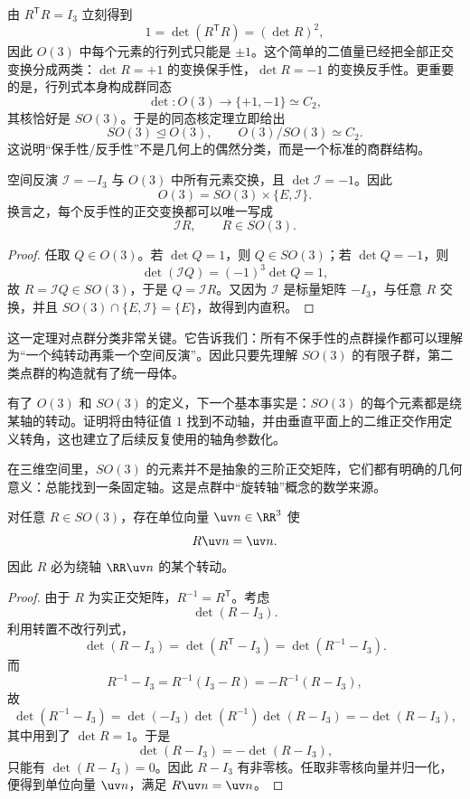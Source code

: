 由 $R^{\mathsf T}R=I_3$ 立刻得到
\[
1=\det(R^{\mathsf T}R)=(\det R)^2,
\]
因此 $O(3)$ 中每个元素的行列式只能是 $\pm1$。这个简单的二值量已经把全部正交变换分成两类：$\det R=+1$ 的变换保手性，$\det R=-1$ 的变换反手性。更重要的是，行列式本身构成群同态
\[
\det:O(3)\longrightarrow\{+1,-1\}\simeq C_2,
\]
其核恰好是 $SO(3)$。于是的同态核定理立即给出
\[
SO(3)\mathrel{\trianglelefteq} O(3),
\qquad
O(3)/SO(3)\simeq C_2.
\]
这说明“保手性/反手性”不是几何上的偶然分类，而是一个标准的商群结构。

\begin{proposition}[$O(3)$ 的直积分解]
空间反演 $\mathcal I=-I_3$ 与 $O(3)$ 中所有元素交换，且 $\det\mathcal I=-1$。因此
\[
O(3)=SO(3)\times\{E,\mathcal I\}.
\]
换言之，每个反手性的正交变换都可以唯一写成
\[
\mathcal I R,
\qquad R\in SO(3).
\]
\label{prop:o3-direct-product}

\end{proposition}

\begin{proof}
任取 $Q\in O(3)$。若 $\det Q=1$，则 $Q\in SO(3)$；若 $\det Q=-1$，则
\[
\det(\mathcal I Q)=(-1)^3\det Q=1,
\]
故 $R=\mathcal I Q\in SO(3)$，于是 $Q=\mathcal I R$。又因为 $\mathcal I$ 是标量矩阵 $-I_3$，与任意 $R$ 交换，并且 $SO(3)\cap\{E,\mathcal I\}=\{E\}$，故得到内直积。
\end{proof}

这一定理对点群分类非常关键。它告诉我们：所有不保手性的点群操作都可以理解为“一个纯转动再乘一个空间反演”。因此只要先理解 $SO(3)$ 的有限子群，第二类点群的构造就有了统一母体。

有了 $O(3)$ 和 $SO(3)$ 的定义，下一个基本事实是：$SO(3)$ 的每个元素都是绕某轴的转动。证明将由特征值 $1$ 找到不动轴，并由垂直平面上的二维正交作用定义转角，这也建立了后续反复使用的轴角参数化。

在三维空间里，$SO(3)$ 的元素并不是抽象的三阶正交矩阵，它们都有明确的几何意义：总能找到一条固定轴。这是点群中“旋转轴”概念的数学来源。

\begin{theorem}[三维转动轴定理]
对任意 $R\in SO(3)$，存在单位向量 $\uv n\in\RR^3$ 使
\[
R\uv n=\uv n.
\]
因此 $R$ 必为绕轴 $\RR\uv n$ 的某个转动。
\label{thm:rotation-axis}

\end{theorem}

\begin{proof}
由于 $R$ 为实正交矩阵，$R^{-1}=R^{\mathsf T}$。考虑
\[
\det(R-I_3).
\]
利用转置不改行列式，
\[
\det(R-I_3)
=\det(R^{\mathsf T}-I_3)
=\det(R^{-1}-I_3).
\]
而
\[
R^{-1}-I_3
=R^{-1}(I_3-R)
=-R^{-1}(R-I_3),
\]
故
\[
\det(R^{-1}-I_3)
=\det(-I_3)\det(R^{-1})\det(R-I_3)
=-\det(R-I_3),
\]
其中用到了 $\det R=1$。于是
\[
\det(R-I_3)=-\det(R-I_3),
\]
只能有 $\det(R-I_3)=0$。因此 $R-I_3$ 有非零核。任取非零核向量并归一化，便得到单位向量 $\uv n$，满足 $R\uv n=\uv n$。
\end{proof}

